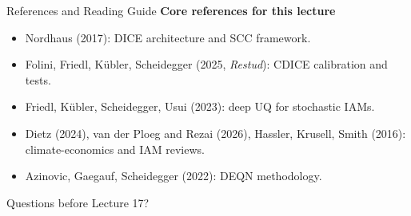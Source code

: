 \documentclass[aspectratio=169,11pt]{beamer}
\newcommand{\emphc}[1]{\textcolor{harvardcrimson}{#1}}
\begin{document}
\begin{frame}{References and Reading Guide}
\small
\textbf{Core references for this lecture}
\begin{itemize}
    \item Nordhaus (2017): DICE architecture and SCC framework.
    \item Folini, Friedl, K\"ubler, Scheidegger (2025, \textit{Restud}): CDICE calibration and tests.
    \item Friedl, K\"ubler, Scheidegger, Usui (2023): deep UQ for stochastic IAMs.
    \item Dietz (2024), van der Ploeg and Rezai (2026), Hassler, Krusell, Smith (2016): climate-economics and IAM reviews.
    \item Azinovic, Gaegauf, Scheidegger (2022): DEQN methodology.
\end{itemize}

\vspace{0.3cm}
\begin{center}
{\LARGE \emphc{Questions before Lecture 17?}}
\end{center}
\end{frame}
\end{document}
